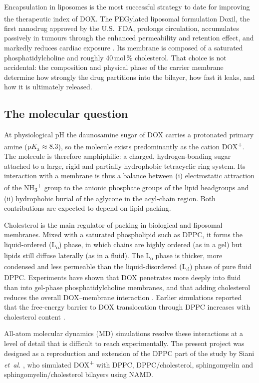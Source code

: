 \documentclass[11pt,a4paper]{article}
\newcommand{\dox}{DOX\textsuperscript{+}}
\newcommand{\nhthree}{NH\textsubscript{3}\textsuperscript{+}}
\newcommand{\Ld}{L\textsubscript{d}}
\newcommand{\Lo}{L\textsubscript{o}}
\begin{document}
Encapsulation in liposomes is the most successful strategy to date for improving the therapeutic index of
DOX. The PEGylated liposomal formulation Doxil\textsuperscript{\textregistered}, the first nanodrug
approved by the U.S.\ FDA, prolongs circulation, accumulates passively in tumours through the enhanced
permeability and retention effect, and markedly reduces cardiac exposure \cite{barenholz2012}. Its
membrane is composed of a saturated phosphatidylcholine and roughly 40\,mol\,\% cholesterol.
That choice is not accidental: the composition and physical phase of the carrier membrane determine how
strongly the drug partitions into the bilayer, how fast it leaks, and how it is ultimately released.

\subsection{The molecular question}
At physiological pH the daunosamine sugar of DOX carries a protonated primary amine
($\mathrm{p}K_\mathrm{a}\approx 8.3$), so the molecule exists predominantly as the cation \dox{}. The
molecule is therefore amphiphilic: a charged, hydrogen-bonding sugar attached to a large, rigid and
partially hydrophobic tetracyclic ring system. Its interaction with a membrane is thus a balance between
(i) electrostatic attraction of the \nhthree{} group to the anionic phosphate groups of the lipid
headgroups and (ii) hydrophobic burial of the aglycone in the acyl-chain region. Both contributions are
expected to depend on lipid packing.

Cholesterol is the main regulator of packing in biological and liposomal membranes. Mixed with a saturated
phospholipid such as DPPC, it forms the liquid-ordered (\Lo) phase, in which chains are highly ordered
(as in a gel) but lipids still diffuse laterally (as in a fluid). The \Lo{} phase is thicker, more
condensed and less permeable than the liquid-disordered (\Ld) phase of pure fluid DPPC. Experiments have
shown that DOX penetrates more deeply into fluid than into gel-phase phosphatidylcholine membranes, and
that adding cholesterol reduces the overall DOX--membrane interaction \cite{siani2021,alves2017}.
Earlier simulations reported that the free-energy barrier to DOX translocation through DPPC increases with
cholesterol content \cite{yacoub2011}.

All-atom molecular dynamics (MD) simulations resolve these interactions at a level of detail that is
difficult to reach experimentally. The present project was designed as a reproduction and extension of the
DPPC part of the study by Siani \emph{et~al.} \cite{siani2021}, who simulated \dox{} with DPPC,
DPPC/cholesterol, sphingomyelin and sphingomyelin/cholesterol bilayers using NAMD.
\end{document}
